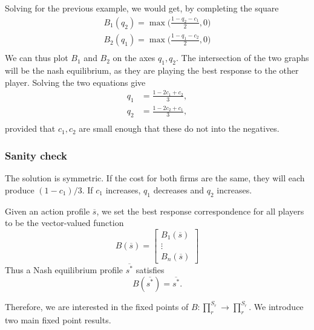 Solving for the previous example, we would get, by completing the square \begin{align*}
    B_1(q_2)=\max\big(\frac{1-q_2-c_1}{2},0\big)\\
    B_2(q_1)=\max\big(\frac{1-q_1-c_2}{2},0\big)\\
\end{align*}
We can thus plot $B_1$ and $B_2$ on the axes $q_1,q_2$. The intersection of the two graphs will be the nash equilibrium, as they are playing the best response to the other player. Solving the two equations give
\begin{align*}
    q_1&=\frac{1-2c_1+c_2}{3},\\
    q_2&=\frac{1-2c_2+c_1}{3},\\
\end{align*}
provided that $c_1,c_2$ are small enough that these do not into the negatives.
\subsubsection*{Sanity check}
The solution is symmetric. If the cost for both firms are the same, they will each produce $(1-c_1)/3$. If $c_1$ increases, $q_1$ decreases and $q_2$ increases.
\begin{notation}
    Given an action profile $\overline{s}$, we set the best response correspondence for all players to be the vector-valued function \[
    B(\overline{s})=\begin{bmatrix}
        B_1(\overline{s})\\ \vdots\\ B_n(\overline{s})
    \end{bmatrix}
    \]
    Thus a Nash equilibrium profile $\overline{s^*}$ satisfies \[
    B(\overline{s^*})=\overline{s^*}.
    \]
\end{notation}

Therefore, we are interested in the fixed points of $B:\prod_{r}^{S_r} \to \prod_{r}^{S_r} $. We introduce two main fixed point results.


